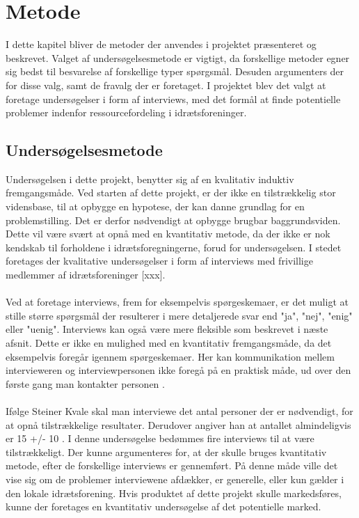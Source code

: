 \chapter{Metode}\label{ch:chlabel}
I dette kapitel bliver de metoder der anvendes i projektet præsenteret og beskrevet. Valget af undersøgelsesmetode er vigtigt, da forskellige metoder egner sig bedst til besvarelse af forskellige typer spørgsmål. Desuden argumenters der for disse valg, samt de fravalg der er foretaget. I projektet blev det valgt at foretage undersøgelser i form af interviews, med det formål at finde potentielle problemer indenfor ressourcefordeling i idrætsforeninger.
\\

\section{Undersøgelsesmetode}
Undersøgelsen i dette projekt, benytter sig af en kvalitativ induktiv fremgangsmåde. 
Ved starten af dette projekt, er der ikke en tilstrækkelig stor vidensbase, til at opbygge en hypotese, der kan danne grundlag for en problemstilling. Det er derfor nødvendigt at opbygge brugbar baggrundsviden. Dette vil være svært at opnå med en kvantitativ metode, da der ikke er nok kendskab til forholdene i idrætsforegningerne, forud for undersøgelsen. I stedet foretages der kvalitative undersøgelser i form af interviews med frivillige medlemmer af idrætsforeninger [xxx].
\\
\\
Ved at foretage interviews, frem for eksempelvis spørgeskemaer, er det muligt at stille større spørgsmål der resulterer i mere detaljerede svar end "ja", "nej", "enig" eller "uenig". Interviews kan også være mere fleksible som beskrevet i næste afsnit. Dette er ikke en mulighed med en kvantitativ fremgangsmåde, da det eksempelvis foregår igennem spørgeskemaer. Her kan kommunikation mellem intervieweren og interviewpersonen ikke foregå på en praktisk måde, ud over den første gang man kontakter personen \citep{kvale2015}.
\\
\\
Ifølge Steiner Kvale skal man interviewe det antal personer der er nødvendigt, for at opnå tilstrækkelige resultater. Derudover angiver han at antallet almindeligvis er 15 +/- 10 \cite{kvale2015}. I denne undersøgelse bedømmes fire interviews til at være tilstrækkeligt. 
Der kunne argumenteres for, at der skulle bruges kvantitativ metode, efter de forskellige interviews er gennemført. På denne måde ville det vise sig om de problemer interviewene afdækker, er generelle, eller kun gælder i den lokale idrætsforening. Hvis produktet af dette projekt skulle markedsføres, kunne der foretages en kvantitativ undersøgelse af det potentielle marked. 
